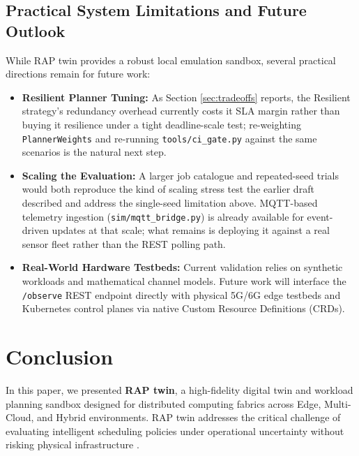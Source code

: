 \documentclass[twoside,twocolumn,10pt]{article}
\begin{document}
\subsection{Practical System Limitations and Future Outlook}
While RAP twin provides a robust local emulation sandbox, several practical directions remain for future work:
\begin{itemize}
    \item \textbf{Resilient Planner Tuning:} As Section \ref{sec:tradeoffs} reports, the Resilient strategy's redundancy overhead currently costs it SLA margin rather than buying it resilience under a tight deadline-scale test; re-weighting \texttt{PlannerWeights} and re-running \texttt{tools/ci\_gate.py} against the same scenarios is the natural next step.
    \item \textbf{Scaling the Evaluation:} A larger job catalogue and repeated-seed trials would both reproduce the kind of scaling stress test the earlier draft described and address the single-seed limitation above. MQTT-based telemetry ingestion (\texttt{sim/mqtt\_bridge.py}) is already available for event-driven updates at that scale; what remains is deploying it against a real sensor fleet rather than the REST polling path.
    \item \textbf{Real-World Hardware Testbeds:} Current validation relies on synthetic workloads and mathematical channel models. Future work will interface the \texttt{/observe} REST endpoint directly with physical 5G/6G edge testbeds and Kubernetes control planes via native Custom Resource Definitions (CRDs).
\end{itemize}


\section{Conclusion}

In this paper, we presented \textbf{RAP twin}, a high-fidelity digital twin and workload planning sandbox designed for distributed computing fabrics across Edge, Multi-Cloud, and Hybrid environments. RAP twin addresses the critical challenge of evaluating intelligent scheduling policies under operational uncertainty without risking physical infrastructure \cite{fuller2020}.
\end{document}
